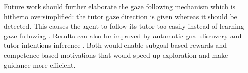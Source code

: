 \documentclass[letterpaper, 10 pt, conference]{ieeeconf}  %
\begin{document}
Future work should further elaborate the gaze following mechanism which is hitherto oversimplified: the tutor gaze direction is given whereas it should be detected. This causes the agent to follow its tutor too easily instead of learning gaze following \cite{carlson_computational_2004}. Results can also be improved by automatic goal-discovery \cite{forestier_autonomous_2016} and tutor intentions inference \cite{diaconescu_inferring_2014}. Both would enable subgoal-based rewards and competence-based motivations \cite{forestier_towards_2015} that would speed up exploration and make guidance more efficient.

\end{document}
